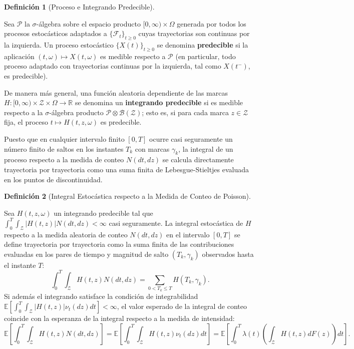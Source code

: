 \documentclass[
  spanish,
  letterpaper,
  DIV=11,
  numbers=noendperiod]{scrreprt}
\theoremstyle{plain}
\theoremstyle{plain}
\theoremstyle{plain}
\theoremstyle{definition}
\newtheorem{definition}{Definición}[chapter]
\theoremstyle{remark}
\begin{document}
\begin{definition}[Proceso e Integrando
Predecible]\protect\hypertarget{def-proceso-predecible}{}\label{def-proceso-predecible}

Sea \(\mathcal{P}\) la \(\sigma\)-álgebra sobre el espacio producto
\([0, \infty) \times \Omega\) generada por todos los procesos
estocásticos adaptados a \(\{\mathcal{F}_t\}_{t \ge 0}\) cuyas
trayectorias son continuas por la izquierda. Un proceso estocástico
\(\{X(t)\}_{t \ge 0}\) se denomina \textbf{predecible} si la aplicación
\((t, \omega) \mapsto X(t, \omega)\) es medible respecto a
\(\mathcal{P}\) (en particular, todo proceso adaptado con trayectorias
continuas por la izquierda, tal como \(X(t^-)\), es predecible).

De manera más general, una función aleatoria dependiente de las marcas
\(H: [0, \infty) \times \mathcal{Z} \times \Omega \to \mathbb{R}\) se
denomina un \textbf{integrando predecible} si es medible respecto a la
\(\sigma\)-álgebra producto
\(\mathcal{P} \otimes \mathcal{B}(\mathcal{Z})\); esto es, si para cada
marca \(z \in \mathcal{Z}\) fija, el proceso
\(t \mapsto H(t, z, \omega)\) es predecible.

\end{definition}

Puesto que en cualquier intervalo finito \([0, T]\) ocurre casi
seguramente un número finito de saltos en los instantes \(T_k\) con
marcas \(\gamma_k\), la integral de un proceso respecto a la medida de
conteo \(N(dt, dz)\) se calcula directamente trayectoria por trayectoria
como una suma finita de Lebesgue-Stieltjes evaluada en los puntos de
discontinuidad.

\begin{definition}[Integral Estocástica respecto a la Medida de Conteo
de
Poisson]\protect\hypertarget{def-integral-conteo}{}\label{def-integral-conteo}

Sea \(H(t, z, \omega)\) un integrando predecible tal que
\(\displaystyle \int_0^T \int_{\mathcal{Z}} \vert H(t, z) \vert N(dt, dz) < \infty\)
casi seguramente. La integral estocástica de \(H\) respecto a la medida
aleatoria de conteo \(N(dt, dz)\) en el intervalo \([0, T]\) se define
trayectoria por trayectoria como la suma finita de las contribuciones
evaluadas en los pares de tiempo y magnitud de salto \((T_k, \gamma_k)\)
observados hasta el instante \(T\): \[
\int_0^T \int_{\mathcal{Z}} H(t, z) N(dt, dz) = \sum_{0 < T_k \le T} H(T_k, \gamma_k).
\] Si además el integrando satisface la condición de integrabilidad
\(\mathbb{E}\left[ \int_0^T \int_{\mathcal{Z}} \vert H(t, z) \vert \nu_t(dz) dt \right] < \infty\),
el valor esperado de la integral de conteo coincide con la esperanza de
la integral respecto a la medida de intensidad: \[
\mathbb{E}\left[ \int_0^T \int_{\mathcal{Z}} H(t, z) N(dt, dz) \right] = \mathbb{E}\left[ \int_0^T \int_{\mathcal{Z}} H(t, z) \nu_t(dz) dt \right] = \mathbb{E}\left[ \int_0^T \lambda(t) \left( \int_{\mathcal{Z}} H(t, z) dF(z) \right) dt \right].
\]

\end{definition}
\end{document}
